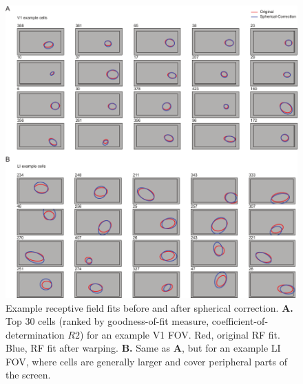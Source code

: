 \begin{figure}[hbt!]
\includegraphics[width=\textwidth]{figures/supplemental/fig_s9_spherical_correction_examples/fig_s9_spherical_correction_examples.pdf}
    \centering
    \caption[Example RFs after spherical correction]{Example receptive field fits before and after spherical correction.
    \textbf{A.} Top 30 cells (ranked by goodness-of-fit measure, coefficient-of-determination $R2$) for an example V1 FOV. Red, original RF fit. Blue, RF fit after warping. 
    \textbf{B.} Same as \textbf{A}, but for an example LI FOV, where cells are generally larger and cover peripheral parts of the screen.
    \label{supfig:spherical_correction_examples}}
\end{figure}



